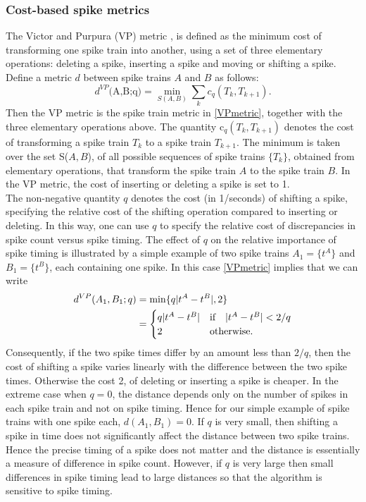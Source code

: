 \subsubsection{Cost-based spike metrics}
The Victor and Purpura (VP) metric \cite{Victor1996, Victor1998}, is defined as the minimum cost of transforming one spike train into another, using a set of three elementary operations:
deleting a spike, inserting a spike and moving or shifting a spike. Define a metric $d$ between spike trains $A$ and $B$ as follows:
\begin{equation}\label{VPmetric}
\text{$d^{VP}$(A,B;q)} = \displaystyle \min_{S(A,B)} \sum_{k} c_{q}(T_{k}, T_{k+1}). 
\end{equation} 
Then the VP metric is the spike train metric in \eqref{VPmetric}, together with the three elementary operations above.
The quantity c$_{q}(T_{k},T_{k+1})$ denotes the cost of transforming a spike train $T_{k}$ to a spike train $T_{k+1}$. The minimum is taken over the set S($A,B$), of all possible sequences of spike trains $\{T_{k}\}$, obtained from elementary operations, that transform the spike train $A$ to the spike train $B$.
In the VP metric, the cost of inserting or deleting a spike is set to 1.\\

The non-negative quantity $q$ denotes the cost (in 1/seconds) of shifting a spike, specifying the relative cost of the shifting operation compared to inserting or deleting. In this way, one can use $q$ to specify the relative cost of discrepancies in spike count versus spike timing.
The effect of $q$ on the relative importance of spike timing is illustrated by a simple example 
of two spike trains $A_1 = \{t^A\}$ and $B_1 = \{t^B\}$, each containing one spike.
In this case \eqref{VPmetric} implies that we can write 
\begin{align*}
d^{VP}(A_1,B_1;q) &= \displaystyle \min \{ q\lvert t^{A} - t^{B}\rvert,  2 \}\\
  &= \begin{cases} 
       q\lvert t^{A} - t^{B}\rvert & \text{if} \quad  \lvert t^{A} - t^{B}\rvert < 2/q \\
2 & \text{otherwise}.        
\end{cases}
\end{align*}
Consequently, if the two spike times differ by an amount less than $2/q$, then the cost of shifting a spike varies linearly with the difference between the two spike times. Otherwise
the cost 2, of deleting or inserting a spike is cheaper. In the extreme case when $q=0$, the distance depends only on the number of spikes in each spike train and not on spike timing.
Hence for our simple example of spike trains with one spike each, $d(A_1,B_1) = 0.$
If $q$ is very small, then shifting a spike in time does not significantly affect the distance between two spike trains. Hence the precise timing of a spike does not matter and the distance is
essentially a measure of difference in spike count.
However, if $q$ is very large then small differences in spike timing lead to large distances so that the algorithm is sensitive to spike timing.\\

